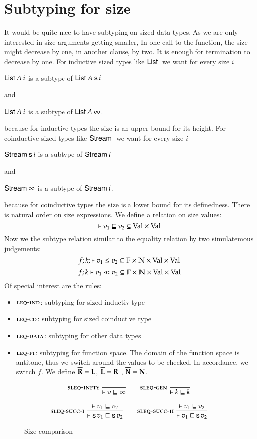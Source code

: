 \section{Subtyping for size}
It would be quite nice to have subtyping on sized data types.
As we are only interested in size arguments getting smaller, 
In one call to the function, the size might decrease by one, in another clause, by two.
It is enough for termination to decrease by one.
For inductive sized types like $\mathsf{List}\:$ we want for every size $i$
\begin{bsp}
$\mathsf{List}\: A\: i$ is a subtype of $\mathsf{List}\: A \: \mathsf{s}\, i$
\end{bsp}
and
\begin{bsp}
$\mathsf{List}\: A\: i$ is a subtype of $\mathsf{List}\: A \: \infty$.
\end{bsp}
because for inductive types the size is an upper bound for its height.
For coinductive sized types like $\mathsf{Stream}\:$ we want for every size $i$
\begin{bsp}
$\mathsf{Stream}\: \mathsf{s}\, i $ is a subtype of $\mathsf{Stream}\: i$
\end{bsp}
and
\begin{bsp}
$\mathsf{Stream}\: \infty$ is a subtype of $\mathsf{Stream}\: i$.
\end{bsp}
because for coinductive types the size is a lower bound for its definedness.
There is natural order on size expressions.
We define a relation on size values:
\[\vdash v_1\sqsubseteq v_2 \subseteq \mathrm{Val} \times \mathrm{Val} \]
Now we the subtype relation similar to the equality relation by two simulatemous judgements:
\[f;k;\vdash v_1\leq v_2 \subseteq \mathbb{F} \times \mathbb{N} \times \mathrm{Val} \times \mathrm{Val} \]
\[f;k\vdash v_1{\:\ll\:}v_2 \subseteq \mathbb{F} \times \mathbb{N} \times\mathrm{Val} \times \mathrm{Val} \]
Of special interest are the rules:
\begin{itemize}
\item
$\mbox{\sc leq-ind}$: subtyping for sized inductiv type 
\item
$\mbox{\sc leq-co}$: subtyping for sized coinductive type
\item
$\mbox{\sc leq-data}$: subtyping for other data types
\item
$\mbox{\sc leq-pi}$: subtyping for function space. 
The domain of the function space is antitone, thus we switch around
the values to be checked. In accordance, we switch $f$.
We define $\overline{\mathbf{R}}=\mathbf{L}$,  $\overline{\mathbf{L}}=\mathbf{R}$ ,  $\overline{\mathbf{N}}=\mathbf{N}$.
 
\end{itemize}
\begin{figure}[p]
\begin{gather*}
\mbox{\sc sleq-infty}\ \dfrac{}{\vdash v\sqsubseteq\infty}
\qquad
\mbox{\sc sleq-gen}\ \dfrac{}{\vdash k\sqsubseteq k}
\\[2ex]
\mbox{\sc sleq-succ-i}\ \dfrac{\vdash v_1\sqsubseteq v_2}{\vdash\mathsf{s}\, v_1\sqsubseteq\mathsf{s}\, v_2}
\qquad
\mbox{\sc sleq-succ-ii}\ \dfrac{\vdash v_1\sqsubseteq v_2}{\vdash v_1\sqsubseteq\mathsf{s}\, v_2}
\end{gather*}
\caption{Size comparison}
\end{figure}


